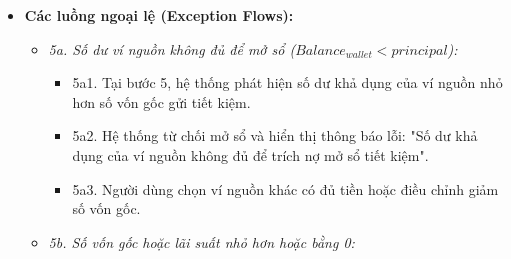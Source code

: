 \documentclass[11pt,a4paper]{article}
\providecommand{\tightlist}{
  \setlength{\itemsep}{0pt}\setlength{\parskip}{0pt}}
\begin{document}
\begin{itemize}
\begin{itemize}
\begin{itemize}
      \begin{itemize}
      \tightlist
      \item
        Số ngày thực gửi: \(Days = currentDate - start\).
      \item
        Lãi cam kết ban đầu bị mất:
        \(ExpectedInterest = \frac{Principal \times Rate \times TermDays}{365}\).
      \item
        Lãi không kỳ hạn thực nhận:
        \(ActualInterest = \frac{Principal \times demandRate \times Days}{365}\).
      \item
        Khoản thiệt hại lãi:
        \(\Delta Loss = ExpectedInterest - ActualInterest\).
      \item
        Tổng tiền thực nhận chuyển về ví:
        \(Payout = Principal + ActualInterest\).
      \end{itemize}
    \item
      2c4. Người dùng kiểm tra số liệu, chọn ví nhận tiền, tích chọn ô
      cam kết chấp nhận mất lãi và nhấn "Xác nhận tất toán trước hạn".
    \item
      2c5. Hệ thống cộng số tiền \(Payout\) vào số dư khả dụng của ví
      nhận tiền theo quy tắc \texttt{BR-FIN-02}.
    \item
      2c6. Hệ thống cập nhật trạng thái sổ tiết kiệm sang
      \texttt{SETTLED\_EARLY}, ghi nhận \texttt{settledDate},
      \texttt{actualInterest}, và khoản lãi bị mất
      \texttt{lostInterest\ =\ \textbackslash{}Delta\ Loss}.
    \item
      2c7. Hệ thống gỡ liên kết sổ tiết kiệm khỏi quỹ mục tiêu liên quan
      (nếu có) theo quy tắc \texttt{BR-FIN-08}.
    \item
      2c8. Hệ thống hiển thị thông báo tất toán trước hạn hoàn tất, ghi
      nhận vào sổ nhật ký tài chính.
    \end{itemize}
  \end{itemize}
\item
  \textbf{Các luồng ngoại lệ (Exception Flows):}

  \begin{itemize}
  \tightlist
  \item
    \emph{5a. Số dư ví nguồn không đủ để mở sổ
    (\(Balance_{wallet} < principal\)):}

    \begin{itemize}
    \tightlist
    \item
      5a1. Tại bước 5, hệ thống phát hiện số dư khả dụng của ví nguồn
      nhỏ hơn số vốn gốc gửi tiết kiệm.
    \item
      5a2. Hệ thống từ chối mở sổ và hiển thị thông báo lỗi: "Số dư khả
      dụng của ví nguồn không đủ để trích nợ mở sổ tiết kiệm".
    \item
      5a3. Người dùng chọn ví nguồn khác có đủ tiền hoặc điều chỉnh giảm
      số vốn gốc.
    \end{itemize}
  \item
    \emph{5b. Số vốn gốc hoặc lãi suất nhỏ hơn hoặc bằng 0:}


\end{itemize}
\end{itemize}
\end{document}
